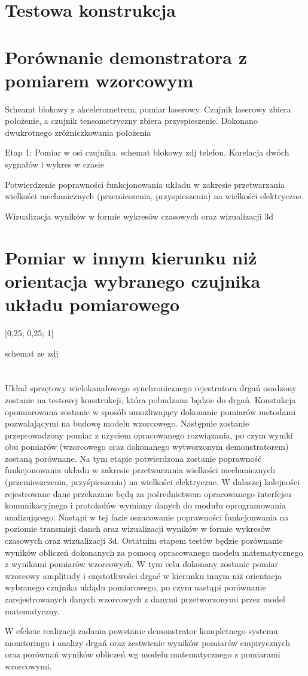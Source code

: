 \documentclass[]{article}
\title{}
\author{}
\date{}
\begin{document}
\maketitle

\section{Testowa konstrukcja}

\section{Porównanie demonstratora z pomiarem wzorcowym}
Scheamt blokowy z akcelerometrem, pomiar laserowy. Czujnik laserowy zbiera położenie, a czujnik tensometryczny zbiera przyspieszenie. Dokonano dwukrotnego zróżniczkowania położenia

Etap 1: Pomiar w osi czujnika. schemat blokowy zdj telefon. Korelacja dwóch sygnałów i wykres w czasie 



Potwierdzenie poprawności funkcjonowania układu w zakresie przetwarzania wielkości mechanicznych (przemieszenia, przyspieszenia) na wielkości elektryczne. 

Wizualizacja wyników w formie wykresów czasowych oraz wizualizacji 3d

\section{Pomiar w innym kierunku niż orientacja wybranego czujnika układu pomiarowego}

[0,25; 0,25; 1]

schemat ze zdj


\section{}
Układ sprzętowy wielokanałowego synchronicznego rejestratora drgań osadzony zostanie na testowej
konstrukcji, która pobudzana będzie do drgań. Konstukcja opomiarowana zostanie w sposób umożliwający
dokonanie pomiarów metodami pozwalającymi na budowę modelu wzorcowego. Następnie zostanie
przeprowadzony pomiar z użyciem opracowanego rozwiązania, po czym wyniki obu pomiarów (wzorcowego
oraz dokonanego wytworzonym demonstratorem) zostaną porównane. Na tym etapie potwierdzona zostanie
poprawność funkcjonowania układu w zakresie przetwarzania wielkości mechanicznych (przemieszczenia,
przyśpieszenia) na wielkości elektryczne. W dalaszej kolejności rejestrowane dane przekazane będą za
pośrednictwem opracowanego interfejsu komunikacyjnego i protokołów wymiany danych do modułu
oprogramowania analizującego.
Nastąpi w tej fazie oszacowanie poprawności funkcjonwania na poziomie transmisji danch oraz
wizualizacji wyników w formie wykresów czasowych oraz wizualizacji 3d. Ostatnim etapem testów będzie
porównanie wyników obliczeń dokonanych za pomocą opracowanego modelu matematycznego z wynikami
pomiarów wzorcowych. W tym celu dokonany zostanie pomiar wzorcowy amplitudy i częstotliwości drgać w
kierunku innym niż orientacja wybranego czujnika ukłądu pomiarowego, po czym nastąpi porównanie
zarejestrowanych danych wzorcowych z danymi przetworzonymi przez model matematyczny.

W efekcie realizacji zadania powstanie demonstrator kompletnego systemu monitoringu i analizy drgań
oraz zestwienie wyników pomiarów empirycznych oraz porównań  wyników obliczeń wg modelu
matematycznego z pomiarami wzorcowymi.
\end{document}
